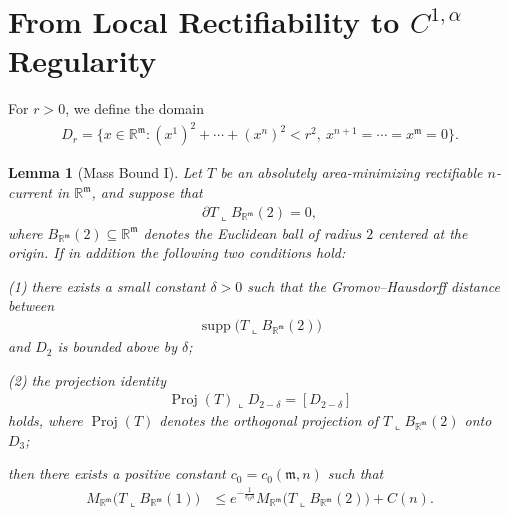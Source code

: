 \documentclass[11pt,reqno]{amsart}
\newcommand{\fm}{\mathfrak{m}}
\renewcommand{\leq}{\leqslant}
\newtheorem{lemma}[theorem]{Lemma}
\theoremstyle{definition}
\numberwithin{equation}{section}
\begin{document}
\section{From Local Rectifiability to $C^{1,\alpha}$ Regularity}\label{sec:rectifiable-C-1-alpha}

For $r>0$, we define the domain
\begin{align}
    D_r = \bigl\{x\in \mathbb{R}^\fm: (x^1)^2+\cdots+(x^n)^2 < r^2,\ x^{n+1} = \cdots = x^\fm=0\bigr\}.
\end{align}

\begin{lemma}[Mass Bound I]\label{lem-massbound1}
Let $T$ be an absolutely area-minimizing rectifiable $n$-current in $\mathbb{R}^\fm$, and suppose that
\begin{align}
   \partial T \mathbin{\llcorner} B_{\mathbb{R}^\fm}(2) = 0,
\end{align}
where \( B_{\mathbb{R}^\fm}(2) \subseteq \mathbb{R}^\fm \) denotes the Euclidean ball of radius $2$ centered at the origin. If in addition the following two conditions hold:

(1) there exists a small constant $\delta>0$ such that the Gromov–Hausdorff distance between
\begin{align}
    \operatorname{supp}\bigl(T \mathbin{\llcorner} B_{\mathbb{R}^\fm}(2)\bigr)
\end{align}
and $D_2$ is bounded above by $\delta$;

(2) the projection identity
\begin{align}
     \operatorname{Proj}(T) \mathbin{\llcorner} D_{2-\delta} = [D_{2-\delta}]
\end{align}
holds, where $\operatorname{Proj}(T)$ denotes the orthogonal projection of $T \mathbin{\llcorner} B_{\mathbb{R}^\fm}(2)$ onto $D_3$;

then there exists a positive constant $c_0 = c_0(\fm, n)$ such that
\begin{align}
    M_{\mathbb{R}^\fm}\bigl(T \mathbin{\llcorner} B_{\mathbb{R}^\fm}(1)\bigr)
    &\leq e^{-\frac{1}{c_0\delta}} M_{\mathbb{R}^\fm}\bigl(T \mathbin{\llcorner} B_{\mathbb{R}^\fm}(2)\bigr) + C(n).
\end{align}
\end{lemma}
\end{document}
